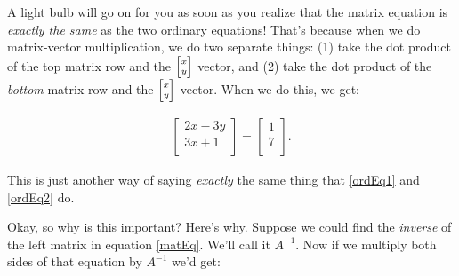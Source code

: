 
A light bulb will go on for you as soon as you realize that the matrix equation
is \textit{exactly the same} as the two ordinary equations! That's because when
we do matrix-vector multiplication, we do two separate things: (1) take the dot
product of the top matrix row and the ${\scriptsize \begin{bmatrix} x \\ y
\end{bmatrix}}$ vector, and (2) take the dot product of the \textit{bottom}
matrix row and the ${\scriptsize \begin{bmatrix} x \\ y \end{bmatrix}}$ vector.
When we do this, we get:

\vspace{-.15in}
\begin{align*}
\begin{bmatrix}
2x - 3y \\
3x + 1 \\
\end{bmatrix} =
\begin{bmatrix}
1 \\ 7 \\
\end{bmatrix}.
\end{align*}
\vspace{-.15in}

This is just another way of saying \textit{exactly} the same thing that
\ref{ordEq1} and \ref{ordEq2} do.

\smallskip

Okay, so why is this important? Here's why. Suppose we could find the
\textit{inverse} of the left matrix in equation \ref{matEq}. We'll call it
$A^{-1}$. Now if we multiply both sides of that equation by $A^{-1}$ we'd get:

